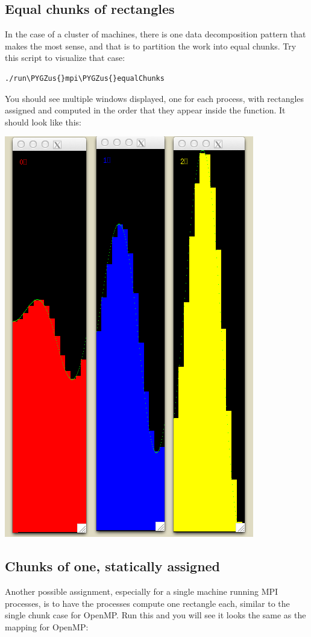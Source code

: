 \documentclass[letterpaper,10pt,openany,oneside]{sphinxmanual}
\def\PYGZus{\char`\_}
\begin{document}
\subsection{Equal chunks of rectangles}
\label{ParallelVis:id1}
In the case of a cluster of machines, there is one data decomposition pattern that makes the most sense, and that is to partition the work into equal chunks.  Try this script to visualize that case:

\begin{Verbatim}[commandchars=\\\{\}]
./run\PYGZus{}mpi\PYGZus{}equalChunks
\end{Verbatim}

You should see multiple windows displayed, one for each process, with rectangles assigned and computed in the order that they appear inside the function. It should look like this:

\includegraphics{run_mp_equalChunks.png}


\subsection{Chunks of one, statically assigned}
\label{ParallelVis:id2}
Another possible assignment, especially for a single machine running MPI processes, is to have the processes compute one rectangle each, similar to the single chunk case for OpenMP. Run this and you will see it looks the same as the mapping for OpenMP:
\end{document}
